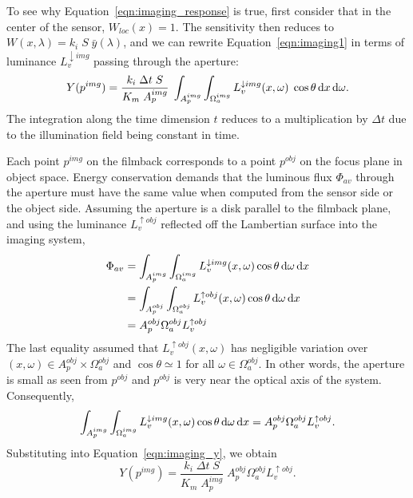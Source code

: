 To see why Equation~\eqref{eqn:imaging_response} is true, first consider that in the center of the sensor,
$W_{loc}(x) = 1$. The sensitivity then reduces to $W(x,\lambda) = k_i\;S\;\bar y(\lambda)$,
and we can rewrite Equation~\eqref{eqn:imaging1} in terms of luminance
$L_v^{\downarrow img}$ passing through the aperture:
\begin{equation}\label{eqn:imaging_y}
Y(p^{img}) 
           = \frac{k_i\; \Delta t \; S}{K_m\;A^{img}_p} \;
             \int_{A_p^{img}} 
             \int_{\Omega_a^{img}} 
                L^{\downarrow img}_{v}(x, \omega) \;
                \cos\theta \mathop{}\!\mathrm{d} x \mathop{}\!\mathrm{d}\omega.
\end{equation}
The integration along the time dimension $t$ reduces to a multiplication
by $\Delta t$ due to the illumination field being constant in time. 

%

Each point $p^{img}$ on the filmback corresponds to a point $p^{obj}$ on the
focus plane in object space. Energy conservation demands that the luminous flux
$\Phi_{av}$ through the aperture must have the same value when computed from the
sensor side or the object side. Assuming the aperture is a disk parallel to 
the filmback plane, and using the luminance $L_v^{\uparrow obj}$ reflected off
the Lambertian surface into the imaging system,
\begin{equation}\label{eqn:imaging_energyconservation}
    \begin{split}
    \Phi_{av} &= \int_{A_p^{img}} \int_{\Omega_a^{img}} L_v^{\downarrow img}(x,\omega) \cos\theta \mathop{}\!\mathrm{d}\omega \mathop{}\!\mathrm{d} x \\
              &= \int_{A_p^{obj}} \int_{\Omega_a^{obj}} L_v^{\uparrow obj}(x,\omega) \cos\theta \mathop{}\!\mathrm{d}\omega \mathop{}\!\mathrm{d} x  \\
              &= A_p^{obj} \Omega_a^{obj} L_v^{\uparrow obj} 
    \end{split}
\end{equation}
The last equality assumed that $L_v^{\uparrow obj}(x,\omega)$ has
negligible variation over $(x,\omega)\in A_p^{obj}\times\Omega^{obj}_a$
and $\cos\theta \simeq 1$ for all $\omega\in\Omega^{obj}_a$. 
In other words, the aperture is small as seen from $p^{obj}$
and $p^{obj}$ is very near the optical axis of the system. 
Consequently,
\begin{equation}
    \int_{A_p^{img}} \int_{\Omega_a^{img}} L_v^{\downarrow img}(x,\omega) \cos\theta \mathop{}\!\mathrm{d}\omega \mathop{}\!\mathrm{d} x 
     = A_p^{obj} \Omega_a^{obj}L_v^{\uparrow obj}.
\end{equation}
Substituting into Equation~\eqref{eqn:imaging_y}, we obtain
\begin{equation}\label{eqn:pixel_value_area_solidangle}
  Y(p^{img}) = \frac{k_i\; \Delta t \; S}{K_m\;A^{img}_p} \; A_p^{obj} \Omega_a^{obj}L_v^{\uparrow obj}.
\end{equation}

